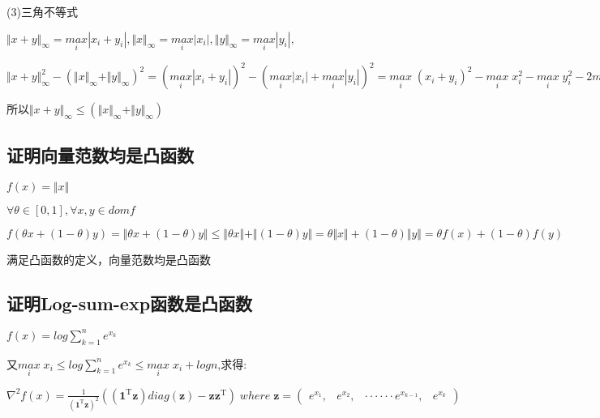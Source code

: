 \documentclass[12pt, a4paper, oneside, fontset=windows]{ctexart}
\begin{document}
(3)三角不等式

$\Vert x+y \Vert_\infty=\underset{i}{max}\left | x_{i}+y_{i} \right |,
\Vert x \Vert_\infty=\underset{i}{max}\left | x_{i} \right |,
\Vert y \Vert_\infty=\underset{i}{max}\left | y_{i} \right |,$

$\Vert x+y \Vert_\infty^{2}-\left (  \Vert x \Vert_\infty+\Vert y \Vert_\infty\right )^{2}=
\left ( \underset{i}{max}\left | x_{i}+y_{i} \right | \right )^{2}-\left (  \underset{i}{max}\left | x_{i} \right |+\underset{i}{max}\left | y_{i} \right |\right )^{2}=\underset{i}{max}\; \left ( x_{i}+y_{i} \right )^{2}-\underset{i}{max}\; x_{i}^{2}-\underset{i}{max}\; y_{i}^{2}-2\underset{i}{max}\left | y_{i} \right |\underset{i}{max}\left | x_{i} \right |=2\underset{i}{max}\;x_{i}y_{i}-2\underset{i}{max}\left | y_{i} \right |\underset{i}{max}\left | x_{i} \right |\leq 0$

所以$\Vert x+y \Vert_\infty\leq \left (  \Vert x \Vert_\infty+\Vert y \Vert_\infty\right )$

\subsection{证明向量范数均是凸函数}

$f(x)=\Vert x \Vert$

$\forall \theta \in \left [  0,1\right ],\forall x,y\in domf$

$f(\theta x+\left (1- \theta \right )y)=\Vert \theta x+\left (1- \theta \right )y \Vert\leq \Vert \theta x\Vert+\Vert \left (1- \theta \right )y\Vert=\theta \Vert x\Vert+\left (1- \theta \right )\Vert y \Vert=\theta f(x)+\left (1- \theta \right )f(y)$

满足凸函数的定义，向量范数均是凸函数

\subsection{证明Log-sum-exp函数是凸函数}
$f(x)=log\sum_{k=1}^{n}e^{x_{k}}$

又$\underset{i}{max}\; x_{i}\leq log\sum_{k=1}^{n}e^{x_{k}}\leq \underset{i}{max}\; x_{i}+logn$,求得:

$\nabla^{2} f(x)=\frac{1}{\left ( \mathbf{1}^\mathrm{T}\mathbf{z} \right )^{2}}\left (  \left ( \mathbf{1}^\mathrm{T}\mathbf{z} \right )diag\left ( \mathbf{z} \right )-\mathbf{z}\mathbf{z}^\mathrm{T}\right )
\; where\; \mathbf{z}=\left (  \begin{matrix}
e^{x_{1}} ,& e^{x_{2}}  ,& \cdot \cdot \cdot \cdot \cdot \cdot e^{x_{k-1}} , & e^{x_{k}} 
\end{matrix}\right )$
\end{document}
